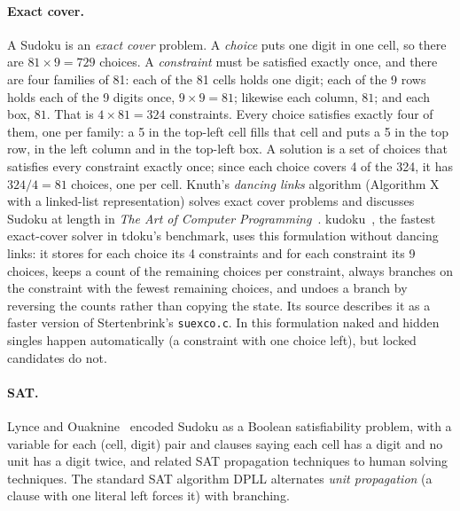 \documentclass[11pt]{article}
\theoremstyle{definition}
\theoremstyle{plain}
\begin{document}
\paragraph{Exact cover.} A Sudoku is an \emph{exact cover} problem. A \emph{choice} puts one digit in one cell, so
there are $81\times 9=729$ choices. A \emph{constraint} must be satisfied exactly once, and there are four families of
81: each of the 81 cells holds one digit; each of the 9 rows holds each of the 9 digits once, $9\times 9=81$; likewise
each column, $81$; and each box, $81$. That is $4\times 81=324$ constraints. Every choice satisfies exactly four of
them, one per family: a 5 in the top-left cell fills that cell and puts a 5 in the top row, in the left column and in
the top-left box. A solution
is a set of choices that satisfies every constraint exactly once; since each choice covers 4 of the 324, it has
$324/4=81$ choices, one per cell. Knuth's \emph{dancing links} algorithm (Algorithm X
with a linked-list representation) solves exact cover problems and discusses Sudoku at length in
\emph{The Art of Computer Programming}~\cite{knuth2022taocp4b}. kudoku~\cite{attractivechaos2011kudoku}, the fastest
exact-cover solver in tdoku's benchmark, uses this formulation without dancing links: it stores for each choice its 4
constraints and for each constraint its 9 choices, keeps a count of the remaining choices per constraint, always
branches on the constraint with the fewest remaining choices, and undoes a branch by reversing the counts rather than
copying the state. Its source describes it as a faster version of Stertenbrink's \texttt{suexco.c}. In this
formulation naked and hidden singles happen automatically (a constraint with one choice left), but locked candidates
do not.

\paragraph{SAT.} Lynce and Ouaknine~\cite{lynce2006sudoku} encoded Sudoku as a Boolean satisfiability problem, with
a variable for each (cell, digit) pair and clauses saying each cell has a digit and no unit has a digit twice, and related SAT propagation techniques to human solving techniques. The standard SAT algorithm DPLL
alternates \emph{unit propagation} (a clause with one literal left forces it) with branching.
\end{document}

